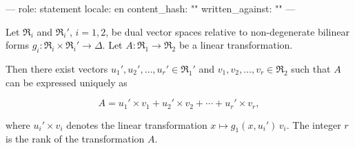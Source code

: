 ---
role: statement
locale: en
content_hash: ""
written_against: ""
---

Let $\mathfrak{R}_i$ and $\mathfrak{R}_i'$, $i = 1, 2$, be dual vector spaces relative to non-degenerate bilinear forms $g_i : \mathfrak{R}_i \times \mathfrak{R}_i' \to \Delta$. Let $A : \mathfrak{R}_1 \to \mathfrak{R}_2$ be a linear transformation.

Then there exist vectors $u_1', u_2', \dots, u_r' \in \mathfrak{R}_1'$ and $v_1, v_2, \dots, v_r \in \mathfrak{R}_2$ such that $A$ can be expressed uniquely as

$$A = u_1' \times v_1 + u_2' \times v_2 + \cdots + u_r' \times v_r,$$

where $u_i' \times v_i$ denotes the linear transformation $x \mapsto g_1(x, u_i')\, v_i$. The integer $r$ is the rank of the transformation $A$.
